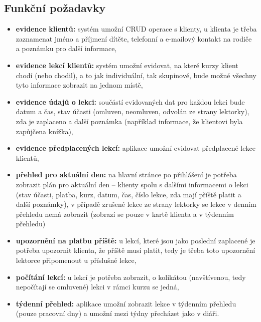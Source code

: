     \subsection{Funkční požadavky}
    \begin{itemize}
        \item \textbf{evidence klientů:} systém umožní CRUD operace s klienty, u klienta je třeba zaznamenat jméno a příjmení dítěte, telefonní a e-mailový kontakt na rodiče a poznámku pro další informace,
        \item \textbf{evidence lekcí klientů:} systém umožní evidovat, na které kurzy klient chodí (nebo chodil), a to jak individuální, tak skupinové, bude možné všechny tyto informace zobrazit na jednom místě,
        \item \textbf{evidence údajů o lekci:} součástí evidovaných dat pro každou lekci bude datum a čas, stav účasti (omluven, neomluven, odvolán ze strany lektorky), zda je zaplaceno a další poznámka (například informace, že klientovi byla zapůjčena knížka),
        \item \textbf{evidence předplacených lekcí:} aplikace umožní evidovat předplacené lekce klientů,
        \item \textbf{přehled pro aktuální den:} na hlavní stránce po přihlášení je potřeba zobrazit plán pro aktuální den -- klienty spolu s dalšími informacemi o lekci (stav účasti, platba, kurz, datum, čas, číslo lekce, zda mají příště platit a další poznámky), v případě zrušené lekce ze strany lektorky se lekce v denním přehledu nemá zobrazit (zobrazí se pouze v kartě klienta a v týdenním přehledu)
        \item \textbf{upozornění na platbu příště:} u lekcí, které jsou jako poslední zaplacené je potřeba upozornit klienta, že příště musí platit, tedy je třeba toto upozornění lektorce připomenout u příslušné lekce,
        \item \textbf{počítání lekcí:} u lekcí je potřeba zobrazit, o kolikátou (navštívenou, tedy nepočítají se omluvené) lekci v rámci kurzu se jedná,
        \item \textbf{týdenní přehled:} aplikace umožní zobrazit lekce v týdenním přehledu (pouze pracovní dny) a umožní mezi týdny přecházet jako v diáři.
    \end{itemize}
    
